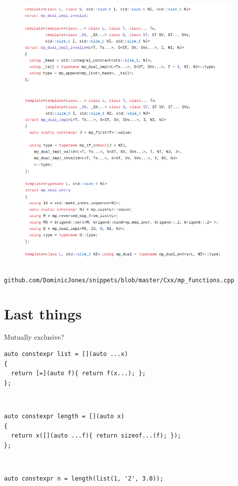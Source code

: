 \documentclass[xcolor=dvipsnames]{beamer}
\begin{document}
\begin{frame}[plain]
\begin{columns}[T]
\begin{column}{0.5\textwidth}
\begin{figure}[H]
        \includegraphics[width=0.99\textwidth]{dual_2}
      \end{figure}
    \end{column}%
  \end{columns}

\vspace{5mm}

\footnotesize{\texttt{github.com/DominicJones/snippets/blob/master/Cxx/mp\_functions.cpp}}
\end{frame}


\section{Last things}


\begin{frame}[fragile]{Mutually exclusive?}
\begin{lstlisting}
auto constexpr list = [](auto ...x)
{
  return [=](auto f){ return f(x...); };
};
\end{lstlisting}

~

\begin{lstlisting}
auto constexpr length = [](auto x)
{
  return x([](auto ...f){ return sizeof...(f); });
};
\end{lstlisting}

~

\begin{lstlisting}
auto constexpr n = length(list(1, '2', 3.0));
\end{lstlisting}
\end{frame}
\end{document}
